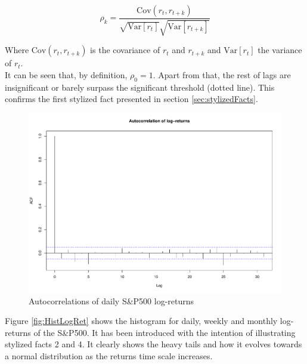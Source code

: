 \begin{equation*}
	\rho_k = \frac{\text{Cov}(r_t, r_{t + k})}{\sqrt{\text{Var} [r_t]}
	\sqrt{\text{Var} [r_{t + k}]}}
\end{equation*} 

Where $\text{Cov}(r_t, r_{t + k})$ is the covariance of $r_t$ and 
$r_{t + k}$ and $\text{Var}[r_t]$ the variance of $r_t$.\\

It can be seen that, by definition, $\rho_0 = 1$. Apart from that, the rest 
of lags are insignificant or barely surpass the significant threshold 
(dotted line). This confirms the first stylized fact presented in section 
\ref{sec:stylizedFacts}.

\begin{figure}[hbtp]
	\centering
	\includegraphics[scale=0.35]{img/finData/acfDailyLogRet}
	\caption{Autocorrelations of daily S\&P500 log-returns}
	\label{fig:acfDailyLogRet}
\end{figure}

Figure \ref{fig:HistLogRet} shows the histogram for daily, weekly and 
monthly log-returns of the S\&P500. It has been introduced with the 
intention of illustrating stylized facts 2 and 4. It clearly shows the heavy 
tails and how it evolves towards a normal distribution as the returns time 
scale increases.\\

